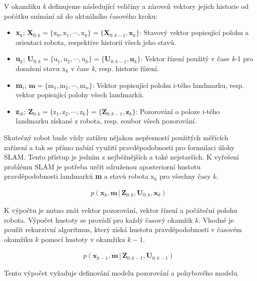 \documentclass[12pt,a4paper]{report}
\begin{document}
V okamžiku \textit{k} definujeme následující veličiny a zároveň vektory jejich historie od počátku snímání až do aktuálního časového kroku:
\begin{itemize}
\item \textbf{x}$_k$; \textbf{X}$_{0:k}=\lbrace \text{x}_0, \text{x}_1,\cdots, \text{x}_k\rbrace = \lbrace \textbf{X}_{0:k-1}, \textbf{x}_k \rbrace$:  
Stavový vektor popisující polohu a orientaci robota, respektive  historii všech jeho stavů.
\item \textbf{u}$_k$; \textbf{U}$_{0:k}=\lbrace \text{u}_1, \text{u}_2,\cdots, \text{u}_k\rbrace = \lbrace \textbf{U}_{0:k-1}, \textbf{u}_k \rbrace$: 
Vektor řízení použitý v čase \textit{k}-1 pro dosažení stavu x$_k$ v čase \textit{k}, resp. historie řízení.
\item \textbf{m}$_i$; $\textbf{m}=\lbrace \text{m}_1, \text{m}_2,\cdots, \text{m}_n\rbrace$: 
Vektor popisující polohu i-tého landmarku, resp. vektor popisující polohy všech landmarků.
\item \textbf{z}$_{ik}$; \textbf{Z}$_{0:k}=\lbrace \text{z}_1, \text{z}_2,\cdots, \text{z}_k\rbrace = \lbrace \textbf{Z}_{0:k-1}, \textbf{z}_k \rbrace$: 
Pozorování o poloze i-tého landmarku získané z robota, resp. soubor všech pozorování.
\end{itemize}

Skutečný robot bude vždy zatížen nějakou nepřesností použitých měřících zařízení a tak se přímo nabízí využití pravděpodobnosti pro formulaci úlohy SLAM. Tento přístup je jedním z nejběžnějších a také nejstarších. K vyřešení problému SLAM je potřeba určit sdruženou aposteriorní hustotu pravděpodobnosti landmarků \textbf{m} a stavů robota x$_k$ pro všechny časy $k$.

\begin{eqnarray}
p(\textbf{x}_k, \textbf{m} \,|\, \textbf{Z}_{0:k}, \textbf{U}_{0:k}, \textbf{x}_0)
\end{eqnarray}

K výpočtu je nutno znát vektor pozorování, vektor řízení a počáteční polohu robota. Výpočet hustoty se provádí pro každý časový okamžik $k$. Vhodné je použít rekurzivní algoritmus, který získá hustotu pravděpodobnosti v časovém okamžiku $k$ pomocí hustoty v okamžiku $k-1$.

\begin{eqnarray}
p(\textbf{x}_{k-1}, \textbf{m} \,|\, \textbf{Z}_{0:k-1}, \textbf{U}_{0:k-1})
\end{eqnarray}

Tento výpočet vyžaduje definování modelu pozorování a pohybového modelu.
\end{document}

